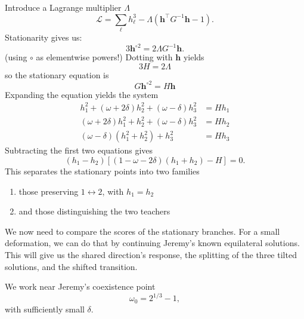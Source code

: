 \documentclass[11pt, reqno]{amsart}
\theoremstyle{notestyle}
\theoremstyle{defstyle}
\begin{document}
Introduce a Lagrange multiplier $\Lambda$
\begin{equation}
    \mathcal L = \sum_\ell h_\ell^3 - \Lambda(\mathbf h^\top G^{-1}\mathbf h - 1).
\end{equation}
Stationarity gives us:
\begin{equation}
3\mathbf h^{\circ 2} = 2\Lambda G^{-1}\mathbf h.
\end{equation}
(using $\circ$ as elementwise powers!)
Dotting with $\mathbf h$ yields
\begin{equation}
    3H = 2\Lambda
\end{equation}
so the stationary equation is
\begin{equation}
\label{eq:stat}
    G\mathbf h^{\circ 2} = H\mathbf h
\end{equation}
Expanding the equation yields the system
\begin{align}
    h_1^2 + (\omega + 2\delta)h_2^2 + (\omega - \delta)h_3^2 &= H h_1 \\
    (\omega + 2\delta)h_1^2 + h_2^2 + (\omega - \delta)h_3^2 &= H h_2 \\
    (\omega - \delta)(h_1^2 + h_2^2) + h_3^2 &= H h_3
\end{align}
Subtracting the first two equations gives
\begin{equation}
    (h_1 - h_2)\left[ (1 - \omega - 2\delta)(h_1 + h_2) - H\right] = 0.
\end{equation}
This separates the stationary points into two families
\begin{enumerate}
    \item those preserving $1 \leftrightarrow 2$, with $h_1 = h_2$
    \item and those distinguishing the two teachers
\end{enumerate}
We now need to compare the scores of the stationary branches. For a small deformation, we can do that by continuing Jeremy's known equilateral solutions. This will give us the shared direction's response, the splitting of the three tilted solutions, and the shifted transition.

We work near Jeremy's coexistence point
\begin{equation}
    \omega_0 = 2^{1/3} - 1,
\end{equation}
with sufficiently small $\delta$.
\end{document}
